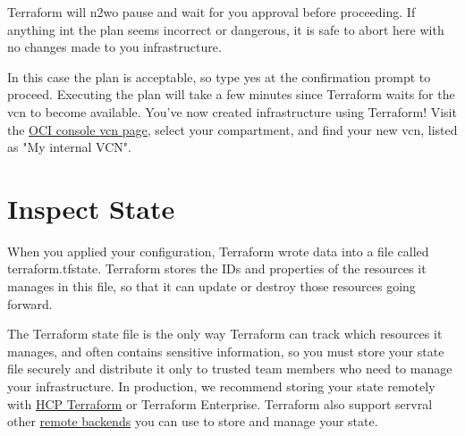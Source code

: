 \documentclass[../main.tex]{subfiles}
\begin{document}
Terraform will n2wo pause and wait for you approval before proceeding. If anything int the plan seems incorrect or dangerous, it is safe to abort here with no changes made to you infrastructure.

In this case the plan is acceptable, so type yes at the confirmation prompt to proceed. Executing the plan will take a few minutes since Terraform waits for the \acrshort{vcn} to become available.
You've now created infrastructure using Terraform! Visit the \href{https://cloud.oracle.com/networking/vcns}{OCI console \acrshort{vcn} page}, select your compartment, and find your new \acrshort{vcn}, listed as "My internal VCN".

\section{Inspect State}
When you applied your configuration, Terraform wrote data into a file called terraform.tfstate. Terraform stores the IDs and properties of the resources it manages in this file, so that it can update or destroy those resources going forward.

The Terraform state file is the only way Terraform can track which resources it manages, and often contains sensitive information, so you must store your state file securely and distribute it only to trusted team members who need to manage your infrastructure. In production, we recommend storing your state remotely with \href{https://cloud.hashicorp.com/products/terraform}{HCP Terraform} or Terraform Enterprise. 
Terraform also support servral other \href{https://developer.hashicorp.com/terraform/language/backend}{remote backends} you can use to store and manage your state.
\end{document}
